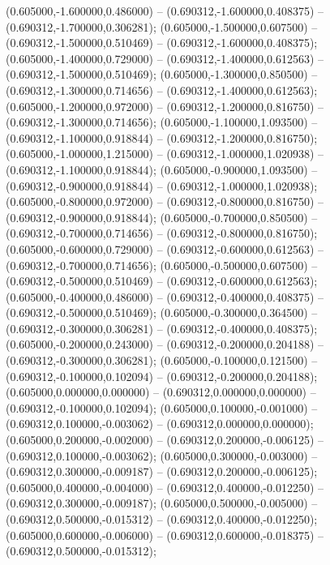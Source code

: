  (0.605000,-1.600000,0.486000) -- (0.690312,-1.600000,0.408375) -- (0.690312,-1.700000,0.306281);
 (0.605000,-1.500000,0.607500) -- (0.690312,-1.500000,0.510469) -- (0.690312,-1.600000,0.408375);
 (0.605000,-1.400000,0.729000) -- (0.690312,-1.400000,0.612563) -- (0.690312,-1.500000,0.510469);
 (0.605000,-1.300000,0.850500) -- (0.690312,-1.300000,0.714656) -- (0.690312,-1.400000,0.612563);
 (0.605000,-1.200000,0.972000) -- (0.690312,-1.200000,0.816750) -- (0.690312,-1.300000,0.714656);
 (0.605000,-1.100000,1.093500) -- (0.690312,-1.100000,0.918844) -- (0.690312,-1.200000,0.816750);
 (0.605000,-1.000000,1.215000) -- (0.690312,-1.000000,1.020938) -- (0.690312,-1.100000,0.918844);
 (0.605000,-0.900000,1.093500) -- (0.690312,-0.900000,0.918844) -- (0.690312,-1.000000,1.020938);
 (0.605000,-0.800000,0.972000) -- (0.690312,-0.800000,0.816750) -- (0.690312,-0.900000,0.918844);
 (0.605000,-0.700000,0.850500) -- (0.690312,-0.700000,0.714656) -- (0.690312,-0.800000,0.816750);
 (0.605000,-0.600000,0.729000) -- (0.690312,-0.600000,0.612563) -- (0.690312,-0.700000,0.714656);
 (0.605000,-0.500000,0.607500) -- (0.690312,-0.500000,0.510469) -- (0.690312,-0.600000,0.612563);
 (0.605000,-0.400000,0.486000) -- (0.690312,-0.400000,0.408375) -- (0.690312,-0.500000,0.510469);
 (0.605000,-0.300000,0.364500) -- (0.690312,-0.300000,0.306281) -- (0.690312,-0.400000,0.408375);
 (0.605000,-0.200000,0.243000) -- (0.690312,-0.200000,0.204188) -- (0.690312,-0.300000,0.306281);
 (0.605000,-0.100000,0.121500) -- (0.690312,-0.100000,0.102094) -- (0.690312,-0.200000,0.204188);
 (0.605000,0.000000,0.000000) -- (0.690312,0.000000,0.000000) -- (0.690312,-0.100000,0.102094);
 (0.605000,0.100000,-0.001000) -- (0.690312,0.100000,-0.003062) -- (0.690312,0.000000,0.000000);
 (0.605000,0.200000,-0.002000) -- (0.690312,0.200000,-0.006125) -- (0.690312,0.100000,-0.003062);
 (0.605000,0.300000,-0.003000) -- (0.690312,0.300000,-0.009187) -- (0.690312,0.200000,-0.006125);
 (0.605000,0.400000,-0.004000) -- (0.690312,0.400000,-0.012250) -- (0.690312,0.300000,-0.009187);
 (0.605000,0.500000,-0.005000) -- (0.690312,0.500000,-0.015312) -- (0.690312,0.400000,-0.012250);
 (0.605000,0.600000,-0.006000) -- (0.690312,0.600000,-0.018375) -- (0.690312,0.500000,-0.015312);
